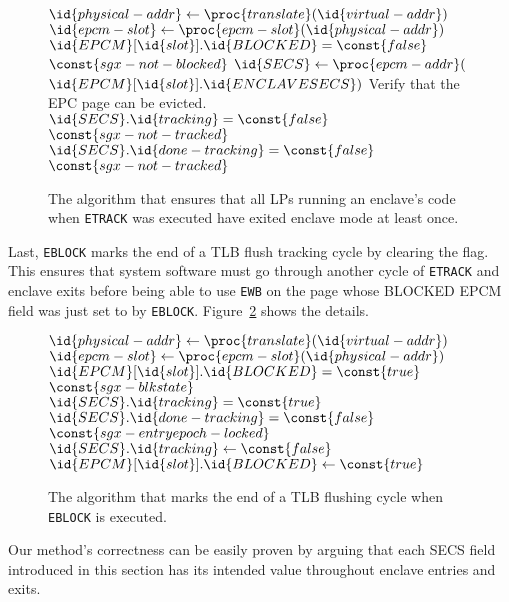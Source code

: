 \begin{figure}[hbt]
  \begin{codebox}
  \li $\id{physical-addr} \gets \proc{translate}(\id{virtual-addr})$
  \li $\id{epcm-slot} \gets \proc{epcm-slot}(\id{physical-addr})$
  \li \If $\id{EPCM}[\id{slot}].\id{BLOCKED} = \const{false}$
  \li   \Then \Return $\const{sgx-not-blocked}$
        \End
  \li $\id{SECS} \gets \proc{epcm-addr}($
      \Indentmore
  \zi   $\id{EPCM}[\id{slot}].\id{ENCLAVESECS})$
      \End
  \zi \Comment Verify that the EPC page can be evicted.
  \li \If $\id{SECS}.\id{tracking} = \const{false}$
  \li   \Then \Return $\const{sgx-not-tracked}$
        \End
  \li \If $\id{SECS}.\id{done-tracking} = \const{false}$
  \li   \Then \Return $\const{sgx-not-tracked}$
        \End
  \end{codebox}
  \caption{
    The algorithm that ensures that all LPs running an enclave's code when
    \texttt{ETRACK} was executed have exited enclave mode at least once.
  }
  \label{fig:sgx_tracking_ewb}
\end{figure}

Last, \texttt{EBLOCK} marks the end of a TLB flush tracking cycle by clearing
the  flag. This ensures that system software must go through
another cycle of \texttt{ETRACK} and enclave exits before being able to use
\texttt{EWB} on the page whose BLOCKED EPCM field was just set to 
by \texttt{EBLOCK}.
Figure~\ref{fig:sgx_tracking_eblock} shows the details.

\begin{figure}[hbt]
  \begin{codebox}
  \li $\id{physical-addr} \gets \proc{translate}(\id{virtual-addr})$
  \li $\id{epcm-slot} \gets \proc{epcm-slot}(\id{physical-addr})$
  \li \If $\id{EPCM}[\id{slot}].\id{BLOCKED} = \const{true}$
  \li   \Then \Return $\const{sgx-blkstate}$
        \End
  \li \If $\id{SECS}.\id{tracking} = \const{true}$
  \li   \Then
          \If $\id{SECS}.\id{done-tracking} = \const{false}$
  \li       \Then \Return $\const{sgx-entryepoch-locked}$
            \End
  \li     $\id{SECS}.\id{tracking} \gets \const{false}$
        \End
  \li $\id{EPCM}[\id{slot}].\id{BLOCKED} \gets \const{true}$
  \end{codebox}
  \caption{
    The algorithm that marks the end of a TLB flushing cycle when
    \texttt{EBLOCK} is executed.
  }
  \label{fig:sgx_tracking_eblock}
\end{figure}

Our method's correctness can be easily proven by arguing that each SECS field
introduced in this section has its intended value throughout enclave entries
and exits.
